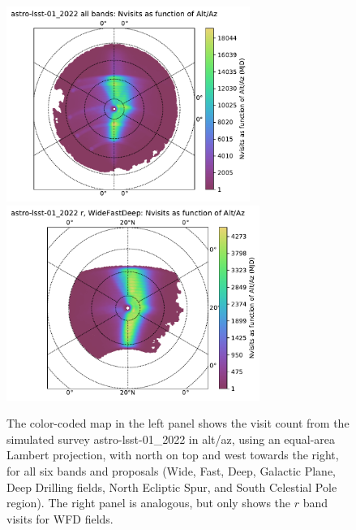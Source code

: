 \documentclass[DM,lsstdraft,authoryear,toc]{lsstdoc}
\begin{document}
\begin{figure}[htb]
\centering
\vskip -0.0in
\includegraphics[height=2.5in]{figures/astro-lsst-01_2022_Nvisits_as_function_of_Alt_Az_all_observations_HEAL_SkyMap}
\includegraphics[height=2.5in]{figures/astro-lsst-01_2022_Nvisits_as_function_of_Alt_Az_r_WideFastDeep_HEAL_SkyMap}
\vskip -0.1in
\caption{The color-coded map in the left panel shows the visit count from the
simulated survey astro-lsst-01\_2022 in alt/az, using an equal-area Lambert projection, 
with north on top and west towards the right, for all six bands and proposals 
(Wide, Fast, Deep, Galactic Plane, Deep Drilling fields, North Ecliptic Spur, and South Celestial Pole region). 
The right panel is analogous, but only shows the $r$ band visits for WFD fields.}
\label{fig:baseline_AltAz}
\end{figure}
\end{document}
